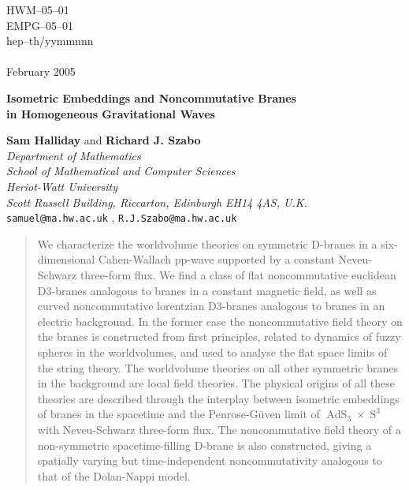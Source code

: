 \documentclass[11pt,a4paper]{article}
\DeclareMathOperator{\AdS}{AdS}
\DeclareMathOperator{\Sphere}{S}
\let\S\Sphere
\begin{document}
\begin{titlepage}
\begin{flushright}

\baselineskip=12pt

HWM--05--01\\
EMPG--05--01\\
hep--th/yymmnnn\\
\hfill{ }\\
February 2005
\end{flushright}

\begin{center}

\vspace{2cm}

\baselineskip=24pt

{\Large\bf Isometric Embeddings and Noncommutative Branes\\ in
  Homogeneous Gravitational Waves}

\baselineskip=14pt

\vspace{1cm}

{\bf Sam Halliday} and {\bf Richard J. Szabo}
\\[4mm]
{\it Department of Mathematics\\ School of Mathematical and Computer
  Sciences\\ Heriot-Watt University\\ Scott Russell Building,
  Riccarton, Edinburgh EH14 4AS, U.K.}
\\{\tt samuel@ma.hw.ac.uk} , {\tt R.J.Szabo@ma.hw.ac.uk}
\\[40mm]

\end{center}

\begin{abstract}

\baselineskip=12pt

We characterize the worldvolume theories on symmetric D-branes in a
six-dimensional Cahen-Wallach pp-wave supported by
a constant Neveu-Schwarz three-form flux. We find a class of flat
noncommutative euclidean D3-branes analogous to branes in a constant
magnetic field, as well as curved noncommutative lorentzian D3-branes
analogous to branes in an electric background. In the former case the
noncommutative field theory on the branes is constructed from first
principles, related to dynamics of fuzzy spheres in the worldvolumes,
and used to analyse the flat space limits of the string theory. The
worldvolume theories on all other symmetric branes in the background
are local field theories. The physical origins of all these theories are
described through the interplay between isometric embeddings of branes
in the spacetime and the Penrose-G\"uven limit of $\AdS_3\times\S^3$
with Neveu-Schwarz three-form flux. The noncommutative field theory of
a non-symmetric spacetime-filling D-brane is also constructed, giving
a spatially varying but time-independent noncommutativity analogous to
that of the Dolan-Nappi model.

\end{abstract}

\end{titlepage}
\setcounter{page}{2}
\end{document}
